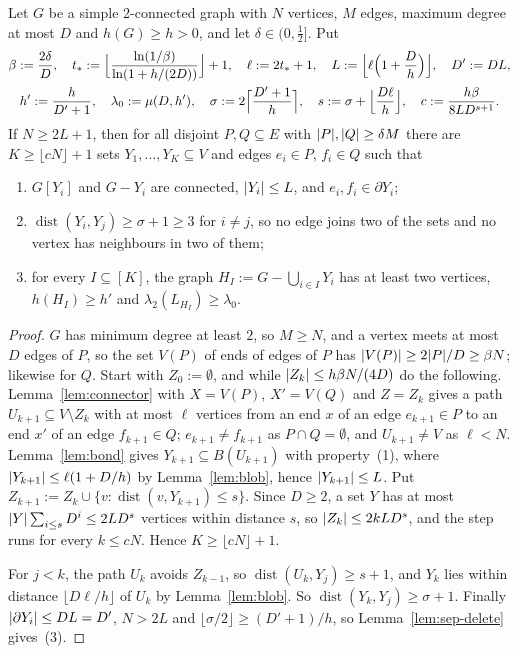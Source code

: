\begin{theorem}\label{thm:packing}
Let $G$ be a simple 2-connected graph with $N$ vertices, $M$ edges, maximum degree at most $D$ and $h(G)\ge h>0$, and let $\delta\in(0,\frac12]$. Put
\begin{gather*}
  \beta:=\frac{2\delta}D,\quad t_*:=\Bigl\lfloor\frac{\ln(1/\beta)}{\ln(1+h/(2D))}\Bigr\rfloor+1,\quad\ell:=2t_*+1,\quad L:=\Bigl\lfloor\ell\Bigl(1+\frac Dh\Bigr)\Bigr\rfloor,\quad D':=DL,\\
  h':=\frac h{D'+1},\quad\lambda_0:=\mu(D,h'),\quad\sigma:=2\Bigl\lceil\frac{D'+1}h\Bigr\rceil,\quad s:=\sigma+\Bigl\lfloor\frac{D\ell}h\Bigr\rfloor,\quad c:=\frac{h\beta}{8LD^{s+1}} .
\end{gather*}
If $N\ge2L+1$, then for all disjoint $P,Q\subseteq E$ with $\lvert P\rvert,\lvert Q\rvert\ge\delta M$ there are $K\ge\lfloor cN\rfloor+1$ sets $Y_1,\dots,Y_K\subseteq V$ and edges $e_i\in P$, $f_i\in Q$ such that
\begin{enumerate}[label=(\arabic*)]
\item $G[Y_i]$ and $G-Y_i$ are connected, $\lvert Y_i\rvert\le L$, and $e_i,f_i\in\partial Y_i$;
\item $\operatorname{dist}(Y_i,Y_j)\ge\sigma+1\ge3$ for $i\ne j$, so no edge joins two of the sets and no vertex has neighbours in two of them;
\item for every $I\subseteq[K]$, the graph $H_I:=G-\bigcup_{i\in I}Y_i$ has at least two vertices, $h(H_I)\ge h'$ and $\lambda_2(L_{H_I})\ge\lambda_0$.
\end{enumerate}
\end{theorem}

\begin{proof}
$G$ has minimum degree at least $2$, so $M\ge N$, and a vertex meets at most $D$ edges of $P$, so the set $V(P)$ of ends of edges of $P$ has $\lvert V(P)\rvert\ge2\lvert P\rvert/D\ge\beta N$; likewise for $Q$. Start with $Z_0:=\emptyset$, and while $\lvert Z_k\rvert\le h\beta N/(4D)$ do the following. Lemma~\ref{lem:connector} with $X=V(P)$, $X'=V(Q)$ and $Z=Z_k$ gives a path $U_{k+1}\subseteq V\setminus Z_k$ with at most $\ell$ vertices from an end $x$ of an edge $e_{k+1}\in P$ to an end $x'$ of an edge $f_{k+1}\in Q$; $e_{k+1}\ne f_{k+1}$ as $P\cap Q=\emptyset$, and $U_{k+1}\ne V$ as $\ell<N$. Lemma~\ref{lem:bond} gives $Y_{k+1}\subseteq B(U_{k+1})$ with property~(1), where $\lvert Y_{k+1}\rvert\le\ell(1+D/h)$ by Lemma~\ref{lem:blob}, hence $\lvert Y_{k+1}\rvert\le L$. Put $Z_{k+1}:=Z_k\cup\{v:\operatorname{dist}(v,Y_{k+1})\le s\}$. Since $D\ge2$, a set $Y$ has at most $\lvert Y\rvert\sum_{i\le s}D^i\le2LD^s$ vertices within distance $s$, so $\lvert Z_k\rvert\le2kLD^s$, and the step runs for every $k\le cN$. Hence $K\ge\lfloor cN\rfloor+1$.

For $j<k$, the path $U_k$ avoids $Z_{k-1}$, so $\operatorname{dist}(U_k,Y_j)\ge s+1$, and $Y_k$ lies within distance $\lfloor D\ell/h\rfloor$ of $U_k$ by Lemma~\ref{lem:blob}. So $\operatorname{dist}(Y_k,Y_j)\ge\sigma+1$. Finally $\lvert \partial Y_i\rvert\le DL=D'$, $N>2L$ and $\lfloor\sigma/2\rfloor\ge(D'+1)/h$, so Lemma~\ref{lem:sep-delete} gives~(3).
\end{proof}

